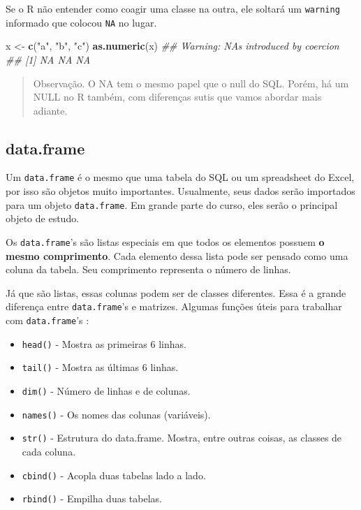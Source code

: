 \documentclass[]{book}
\newenvironment{Shaded}{\begin{snugshade}}{\end{snugshade}}
\newcommand{\CommentTok}[1]{\textcolor[rgb]{0.56,0.35,0.01}{\textit{#1}}}
\newcommand{\KeywordTok}[1]{\textcolor[rgb]{0.13,0.29,0.53}{\textbf{#1}}}
\newcommand{\NormalTok}[1]{#1}
\newcommand{\StringTok}[1]{\textcolor[rgb]{0.31,0.60,0.02}{#1}}
\providecommand{\tightlist}{%
  \setlength{\itemsep}{0pt}\setlength{\parskip}{0pt}}
\begin{document}
Se o R não entender como coagir uma classe na outra, ele soltará um \texttt{warning} informado que colocou \texttt{NA} no lugar.

\begin{Shaded}
\begin{Highlighting}[]
\NormalTok{x <-}\StringTok{ }\KeywordTok{c}\NormalTok{(}\StringTok{"a"}\NormalTok{, }\StringTok{"b"}\NormalTok{, }\StringTok{"c"}\NormalTok{)}
\KeywordTok{as.numeric}\NormalTok{(x)}
\CommentTok{## Warning: NAs introduced by coercion}
\CommentTok{## [1] NA NA NA}
\end{Highlighting}
\end{Shaded}

\begin{quote}
Observação. O NA tem o mesmo papel que o null do SQL. Porém, há um NULL no R também, com diferenças sutis que vamos abordar mais adiante.
\end{quote}

\hypertarget{data.frame}{%
\subsection{data.frame}\label{data.frame}}

Um \texttt{data.frame} é o mesmo que uma tabela do SQL ou um spreadsheet do Excel, por isso são objetos muito importantes. Usualmente, seus dados serão importados para um objeto \texttt{data.frame}. Em grande parte do curso, eles serão o principal objeto de estudo.

Os \texttt{data.frame}'s são listas especiais em que todos os elementos possuem \textbf{o mesmo comprimento}. Cada elemento dessa lista pode ser pensado como uma coluna da tabela. Seu comprimento representa o número de linhas.

Já que são listas, essas colunas podem ser de classes diferentes. Essa é a grande diferença entre \texttt{data.frame}'s e matrizes. Algumas funções úteis para trabalhar com \texttt{data.frame}'s :

\begin{itemize}
\tightlist
\item
  \texttt{head()} - Mostra as primeiras 6 linhas.
\item
  \texttt{tail()} - Mostra as últimas 6 linhas.
\item
  \texttt{dim()} - Número de linhas e de colunas.
\item
  \texttt{names()} - Os nomes das colunas (variáveis).
\item
  \texttt{str()} - Estrutura do data.frame. Mostra, entre outras coisas, as classes de cada coluna.
\item
  \texttt{cbind()} - Acopla duas tabelas lado a lado.
\item
  \texttt{rbind()} - Empilha duas tabelas.
\end{itemize}
\end{document}
